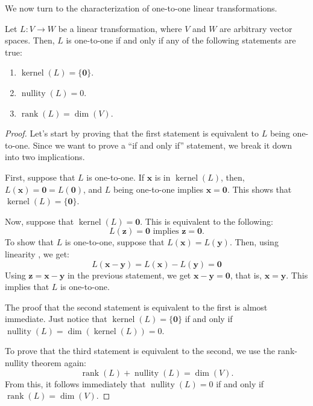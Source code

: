 \documentclass[12pt]{article}
\DeclareMathOperator{\rank}{rank}
\DeclareMathOperator{\kernel}{kernel}
\DeclareMathOperator{\nullity}{nullity}
\begin{document}
We now turn to the characterization of one-to-one linear transformations.

\begin{theorem}
\label{characterization-one-to-one}
Let $L:V\to W$ be a linear transformation, where $V$ and $W$ are arbitrary vector spaces. Then, $L$ is one-to-one if and only if any of the following statements are true:
\begin{enumerate}
\item $\kernel(L)=\{\mathbf{0}\}$.
\item $\nullity(L)=0$.
\item $\rank(L)=\dim(V)$.
\end{enumerate}
\end{theorem}

\begin{proof}
Let's start by proving that the first statement is equivalent to $L$ being one-to-one. Since we want to prove a ``if and only if'' statement, we break it down into two implications.

First, suppose that $L$ is one-to-one. If $\mathbf{x}$ is in $\kernel(L)$, then, $L(\mathbf{x})=\mathbf{0}=L(\mathbf{0})$, and $L$ being one-to-one implies $\mathbf{x}=\mathbf{0}$. This shows that $\kernel(L)=\{\mathbf{0}\}$.

Now, suppose that $\kernel(L)=\mathbf{0}$. This is equivalent to the following:
\[
L(\mathbf{z})=\mathbf{0} \text{ implies } \mathbf{z}=\mathbf{0}.
\] 
To show that $L$ is one-to-one, suppose that $L(\mathbf{x})=L(\mathbf{y})$. Then, using linearity , we get:
\[
L(\mathbf{x}-\mathbf{y})=L(\mathbf{x})-L(\mathbf{y})=\mathbf{0}
\]
Using $\mathbf{z}=\mathbf{x}-\mathbf{y}$ in the previous statement, we get $\mathbf{x}-\mathbf{y}=\mathbf{0}$, that is, $\mathbf{x}=\mathbf{y}$. This implies that $L$ is one-to-one.

The proof that the second statement is equivalent to the first is almost immediate. Just notice that $\kernel(L)=\{\mathbf{0}\}$ if and only if $\nullity(L)=\dim(\kernel(L))=0$.

To prove that the third statement is equivalent to the second, we use the rank-nullity theorem again:
\[
\rank(L)+\nullity(L)=\dim(V).
\]
From this, it follows immediately that $\nullity(L)=0$ if and only if $\rank(L)=\dim(V)$.
\end{proof}
\end{document}
